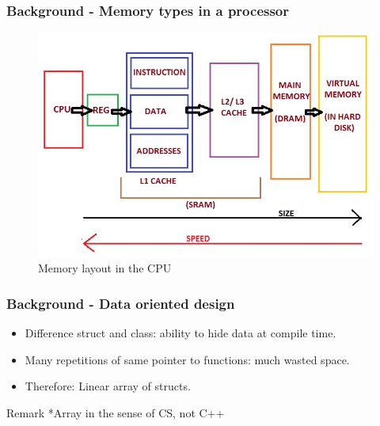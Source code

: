 \documentclass[t]{beamer}
\begin{document}
\begin{frame}
    \frametitle{Background - Memory types in a processor}
    \begin{figure}
        \centering
        \includegraphics[width=.8\textwidth]{figures/CPU memory.jpg}
        \caption{Memory layout in the CPU}
        \label{fig:mem-cpu}
    \end{figure}
\end{frame}

\begin{frame}
    \frametitle{Background - Data oriented design}
    \begin{itemize}
        \item Difference struct and class: ability to hide data at compile time.
        \item Many repetitions of same pointer to functions: much wasted space.
        \item Therefore: Linear array of structs.
    \end{itemize}

    \begin{block}{Remark}
        *Array in the sense of CS, not C++
    \end{block}
\end{frame}
\end{document}
